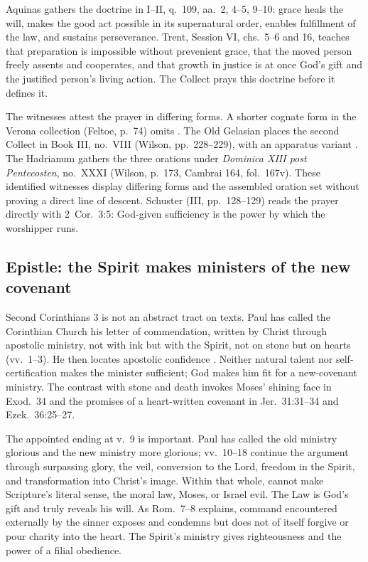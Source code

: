 Aquinas gathers the doctrine in  I--II, q.~109, aa.~2, 4--5, 9--10:
grace heals the will, makes the good act possible in its supernatural order,
enables fulfillment of the law, and sustains perseverance. Trent, Session VI,
chs.~5--6 and 16,
teaches that preparation is impossible without prevenient grace, that the
moved person freely assents and cooperates, and that growth in justice is at
once God's gift and the justified person's living action. The Collect prays
this doctrine before it defines it.

The witnesses attest the prayer in differing forms. A shorter cognate form in
the Verona collection (Feltoe, p.~74) omits
. The Old Gelasian places the second Collect in Book
III, no.~VIII (Wilson, pp.~228--229), with an apparatus variant
. The Hadrianum gathers the three orations under
\emph{Dominica XIII post Pentecosten}, no.~XXXI (Wilson, p.~173, Cambrai 164,
fol.~167v). These identified witnesses display differing forms and the
assembled oration set without proving a direct line of descent.
Schuster (III, pp.~128--129) reads the prayer directly with 2~Cor.~3:5:
God-given sufficiency is the power by which the worshipper runs.

\elementguard
\subsection*{Epistle: the Spirit makes ministers of the new covenant }

Second Corinthians 3 is not an abstract tract on texts. Paul has called the
Corinthian Church his letter of commendation, written by Christ through
apostolic ministry, not with ink but with the Spirit, not on stone but on
hearts (vv.~1--3). He then locates apostolic confidence
. Neither natural talent nor self-certification
makes the minister sufficient; God makes him fit for a new-covenant ministry.
The contrast with stone and death invokes Moses' shining face in Exod.~34 and
the promises of a heart-written covenant in Jer.~31:31--34 and
Ezek.~36:25--27.

The appointed ending at v.~9 is important. Paul has called the old ministry
glorious and the new ministry more glorious; vv.~10--18 continue the argument
through surpassing glory, the veil, conversion to the Lord, freedom in the
Spirit, and transformation into Christ's image. Within that whole,
 cannot make Scripture's literal sense, the moral law,
Moses, or Israel evil. The Law is God's gift and truly reveals his will. As
Rom.~7--8 explains, command encountered externally by the sinner exposes and
condemns but does not of itself forgive or pour charity into the heart. The
Spirit's ministry gives righteousness and the power of a filial obedience.

